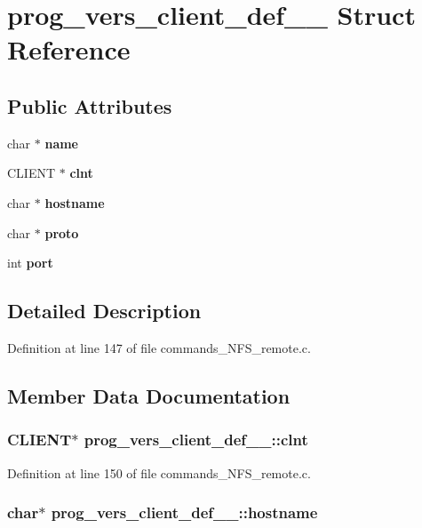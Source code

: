\section{prog\_\-vers\_\-client\_\-def\_\-\_\- Struct Reference}
\label{structprog__vers__client__def____}
\subsection*{Public Attributes}
\begin{DoxyCompactItemize}
\item 
char $\ast$ {\bf name}
\item 
CLIENT $\ast$ {\bf clnt}
\item 
char $\ast$ {\bf hostname}
\item 
char $\ast$ {\bf proto}
\item 
int {\bf port}
\end{DoxyCompactItemize}


\subsection{Detailed Description}


Definition at line 147 of file commands\_\-NFS\_\-remote.c.

\subsection{Member Data Documentation}
\subsubsection[{clnt}]{\setlength{\rightskip}{0pt plus 5cm}CLIENT$\ast$ {\bf prog\_\-vers\_\-client\_\-def\_\-\_\-::clnt}}\label{structprog__vers__client__def_____a73705521fc089ab40193a33cdbd90c01}


Definition at line 150 of file commands\_\-NFS\_\-remote.c.
\subsubsection[{hostname}]{\setlength{\rightskip}{0pt plus 5cm}char$\ast$ {\bf prog\_\-vers\_\-client\_\-def\_\-\_\-::hostname}}\label{structprog__vers__client__def_____ae686f39587dd1adf9a2e03b139ee1f35}


